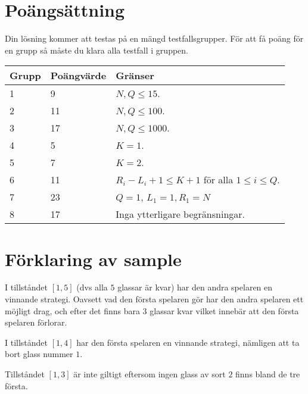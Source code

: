 \section*{Poängsättning}
Din lösning kommer att testas på en mängd testfallsgrupper.
För att få poäng för en grupp så måste du klara alla testfall i gruppen.

\noindent
\begin{tabular}{| l | l | l |}
\hline
Grupp & Poängvärde & Gränser \\ \hline
1     & 9          &  $N,Q \le 15$.\\ \hline
2     & 11         &  $N,Q \le 100$. \\ \hline
3     & 17         &  $N,Q \le 1000$. \\ \hline
4     & 5          &  $K=1$. \\ \hline
5     & 7          &  $K=2$. \\ \hline
6     & 11         &  $R_i - L_i + 1 \le K+1$ för alla $1 \le i \le Q$. \\ \hline
7     & 23         &  $Q=1$, $L_1=1, R_1=N$ \\ \hline
8     & 17         &  Inga ytterligare begränsningar. \\ \hline
\end{tabular}

\section*{Förklaring av sample}
I tillståndet $[1,5]$ (dvs alla $5$ glassar är kvar) har den andra spelaren en vinnande strategi. 
Oavsett vad den första spelaren gör har den andra spelaren ett möjligt drag, och efter det finns bara $3$ glassar kvar
vilket innebär att den första spelaren förlorar.

I tillståndet $[1,4]$ har den första spelaren en vinnande strategi, nämligen att ta bort glass nummer $1$.

Tillståndet $[1,3]$ är inte giltigt eftersom ingen glass av sort $2$ finns bland de tre första.

